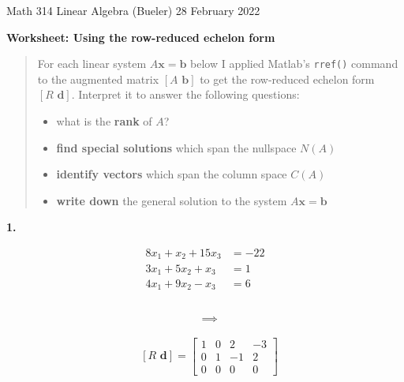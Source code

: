 \documentclass[12pt]{amsart}
\newcommand{\bb}{\mathbf{b}}
\newcommand{\bd}{\mathbf{d}}
\newcommand{\bx}{\mathbf{x}}
\newcommand{\prob}[1]{\bigskip\noindent\textbf{#1.}\quad }
\begin{document}
\scriptsize \noindent Math 314 Linear Algebra (Bueler) \hfill 28 February 2022 
\normalsize\medskip

\Large\centerline{\textbf{Worksheet: Using the row-reduced echelon form}}
\medskip
\normalsize

\thispagestyle{empty}
\begin{quote}
For each linear system $A\bx=\bb$ below I applied Matlab's \texttt{rref()} command to the augmented matrix $[A \,\,\bb]$ to get the row-reduced echelon form $[R \,\,\bd]$.  Interpret it to answer the following questions:

\medskip
\begin{itemize}
\item what is the \textbf{rank} of $A$?
\item \textbf{find special solutions} which span the nullspace $N(A)$
\item \textbf{identify vectors} which span the column space $C(A)$
\item \textbf{write down} the general solution to the system $A\bx=\bb$
\end{itemize}
\end{quote}

\prob{1}
\begin{minipage}[t]{3in}
\begin{align*}
8 x_1 + x_2 + 15 x_3 &= -22 \\
3 x_1 + 5 x_2 + x_3 &= 1 \\
4 x_1 + 9 x_2 - x_3 &= 6
\end{align*}
\end{minipage}
\begin{minipage}[t]{1in}
\begin{align*}
&\phantom{x} \\
&\implies
\end{align*}
\end{minipage}
\begin{minipage}[t]{3in}
\medskip

\begin{align*}
&[R\,\,\bd] = \begin{bmatrix} 1 & 0 & 2 & -3 \\ 0 & 1 & -1 & 2 \\ 0 & 0 & 0 & 0 \end{bmatrix}
\end{align*}\end{minipage}
\vfill
\end{document}
